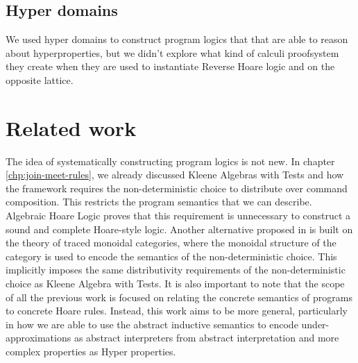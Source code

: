 \subsection{Hyper domains}
We used hyper domains to construct program logics that that are able to reason
about hyperproperties, but we didn't explore what kind of calculi proofsystem 
they create when they are used to instantiate Reverse Hoare logic and on the 
opposite lattice.

\section{Related work}
The idea of systematically constructing program logics is not new. In chapter
\ref{chp:join-meet-rules}, we already discussed Kleene Algebras with Tests
\cite{Kozen97} and how the framework requires the non-deterministic choice to
distribute over command composition. This restricts the program semantics that
we can describe. Algebraic Hoare Logic proves that this requirement is
unnecessary to construct a sound and complete Hoare-style logic. Another
alternative proposed in \cite{Martin06} is built on the theory of traced
monoidal categories, where the monoidal structure of the category is used to
encode the semantics of the non-deterministic choice. This implicitly imposes
the same distributivity requirements of the non-deterministic choice as Kleene
Algebra with Tests. 
It is also important to note that the scope of all the
previous work is focused on relating the concrete semantics of programs to
concrete Hoare rules. Instead, this work aims to be more general, particularly
in how we are able to use the abstract inductive semantics to encode
under-approximations as abstract interpreters from abstract interpretation and
more complex properties as Hyper properties.

